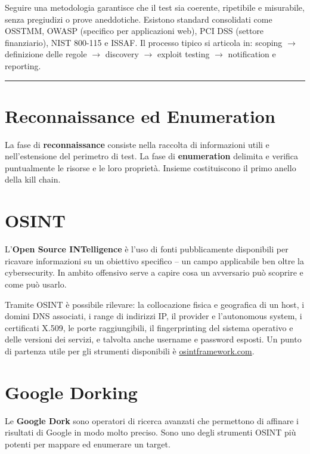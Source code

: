 \documentclass[12pt, a4paper]{report}
\begin{document}
Seguire una metodologia garantisce che il test sia coerente, ripetibile e misurabile, senza pregiudizi o prove aneddotiche. Esistono standard consolidati come OSSTMM, OWASP (specifico per applicazioni web), PCI DSS (settore finanziario), NIST 800-115 e ISSAF. Il processo tipico si articola in: scoping $\to$ definizione delle regole $\to$ discovery $\to$ exploit testing $\to$ notification e reporting.

\noindent\rule{\textwidth}{0.4pt}

\section{Reconnaissance ed Enumeration}

La fase di \textbf{reconnaissance} consiste nella raccolta di informazioni utili e nell'estensione del perimetro di test. La fase di \textbf{enumeration} delimita e verifica puntualmente le risorse e le loro proprietà. Insieme costituiscono il primo anello della kill chain.

\section{OSINT}

L'\textbf{Open Source INTelligence} è l'uso di fonti pubblicamente disponibili per ricavare informazioni su un obiettivo specifico – un campo applicabile ben oltre la cybersecurity. In ambito offensivo serve a capire cosa un avversario può scoprire e come può usarlo.

Tramite OSINT è possibile rilevare: la collocazione fisica e geografica di un host, i domini DNS associati, i range di indirizzi IP, il provider e l'autonomous system, i certificati X.509, le porte raggiungibili, il fingerprinting del sistema operativo e delle versioni dei servizi, e talvolta anche username e password esposti. Un punto di partenza utile per gli strumenti disponibili è \href{https://osintframework.com/}{osintframework.com}.

\section{Google Dorking}

Le \textbf{Google Dork} sono operatori di ricerca avanzati che permettono di affinare i risultati di Google in modo molto preciso. Sono uno degli strumenti OSINT più potenti per mappare ed enumerare un target.
\end{document}

